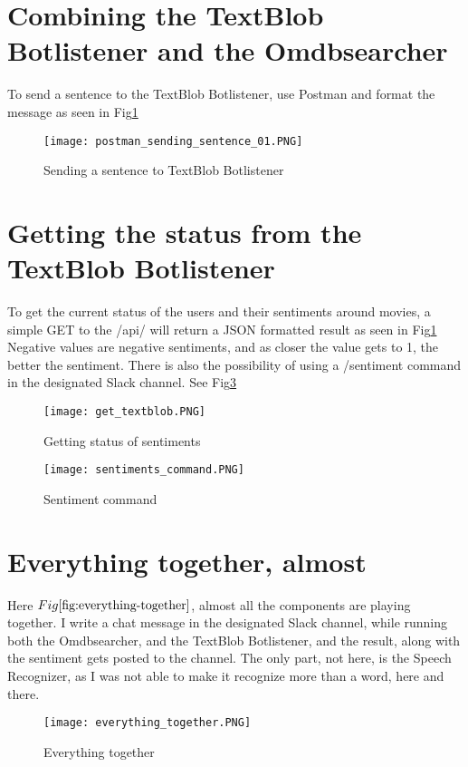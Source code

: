 \documentclass[11pt,fleqn]{book} %
\begin{document}
\newpage
\section{Combining the TextBlob Botlistener and the Omdbsearcher}
To send a sentence to the TextBlob Botlistener, use Postman and format the message as seen in Fig\ref{fig:sending-botlistener}
\begin{figure}[]
  \centering
   \texttt{[image: postman\_sending\_sentence\_01.PNG]}
  \caption{Sending a sentence to TextBlob Botlistener}
  \label{fig:sending-botlistener}
\end{figure}

\newpage
\section{Getting the status from the TextBlob Botlistener}
To get the current status of the users and their sentiments around movies, a simple GET to the /api/ will return a JSON formatted result as seen in Fig\ref{fig:sending-botlistener} Negative values are negative sentiments, and as closer the value gets to 1, the better the sentiment. There is also the possibility of using a /sentiment command in the designated Slack channel. See Fig\ref{fig:sentiment-command}
\begin{figure}[]
  \centering
   \texttt{[image: get\_textblob.PNG]}
  \caption{Getting status of sentiments}
  \label{fig:sentiment-status}
\end{figure}
\begin{figure}[]
  \centering
   \texttt{[image: sentiments\_command.PNG]}
  \caption{Sentiment command}
  \label{fig:sentiment-command}
\end{figure}


\newpage
\section{Everything together, almost}
Here \(Fig\ref{fig:everything-together}\), almost all the components are playing together. I write a chat message in the designated Slack channel, while running both the Omdbsearcher, and the TextBlob Botlistener, and the result, along with the sentiment gets posted to the channel.
The only part, not here, is the Speech Recognizer, as I was not able to make it recognize more than a word, here and there.

\begin{figure}[]
  \centering
   \texttt{[image: everything\_together.PNG]}
  \caption{Everything together}
  \label{fig:everything-together}
\end{figure}
\end{document}
